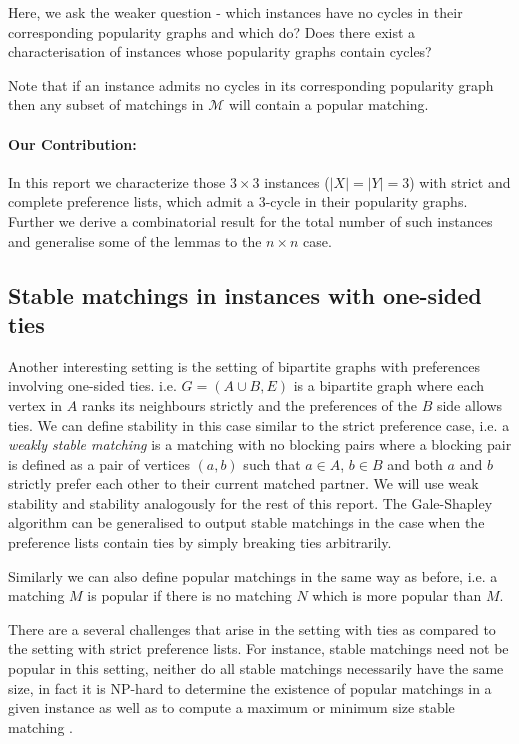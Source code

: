 \documentclass[a4paper,10pt]{article}
\theoremstyle{plain} %
\theoremstyle{plain} %
\begin{document}
Here, we ask the weaker question - which instances have no cycles in their corresponding popularity graphs and which do? Does there exist a characterisation of instances whose popularity graphs contain cycles?

Note that if an instance admits no cycles in its corresponding popularity graph then any subset of matchings in $\mathcal{M}$ will contain a popular matching.

\paragraph{Our Contribution:}

In this report we characterize those $3 \times 3$ instances ($|X| = |Y| = 3$) with strict and complete preference lists, which admit a 3-cycle in their popularity graphs. Further we derive a combinatorial result for the total number of such instances and generalise some of the lemmas to the $n \times n$ case.

\subsection{Stable matchings in instances with one-sided ties}
Another interesting setting is the setting of bipartite graphs with preferences involving one-sided ties. i.e. $G = (A \cup B, E)$ is a bipartite graph where each vertex in $A$ ranks its neighbours strictly and the preferences of the $B$ side allows ties. We can define stability in this case similar to the strict preference case, i.e. a \textit{weakly stable matching} is a matching with no blocking pairs where a blocking pair is defined as a pair of vertices $(a, b)$ such that $a \in A$, $b \in B$ and both $a$ and $b$ strictly prefer each other to their current matched partner.  We will use weak stability and stability analogously for the rest of this report. The Gale-Shapley algorithm can be generalised to output stable matchings in the case when the preference lists contain ties by simply breaking ties arbitrarily.

Similarly we can also define popular matchings in the same way as before, i.e. a matching $M$ is popular if there is no matching $N$ which is more popular than $M$. 

There are a several challenges that arise in the setting with ties as compared to the setting with strict preference lists. For instance, stable matchings need not be popular in this setting, neither do all stable matchings necessarily have the same size, in fact it is NP-hard to determine the existence of popular matchings in a given instance \cite{biro2010popular, cseh2017popular} as well as to compute a maximum or minimum size stable matching \cite{iwama2002stable, manlove2002hard}. 
\end{document}
